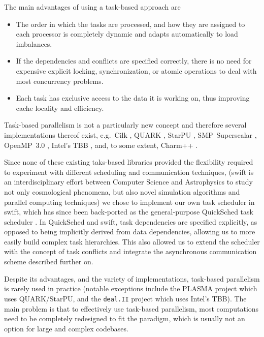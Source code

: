 \documentclass{sig-alternate-05-2015}
\newcommand{\swift}{{\sc swift}\xspace}
\newcommand{\qs}{{\sc QuickSched}\xspace}
\begin{document}
The main advantages of using a task-based approach are
%
\begin{itemize}
    \item The order in which the tasks are processed, and how they
        are assigned to each processor is completely
        dynamic and adapts automatically to load imbalances.
    \item If the dependencies and conflicts are specified correctly,
        there is no need for expensive explicit locking, synchronization,
        or atomic operations to deal with most concurrency problems.
    \item Each task has exclusive access to the data it is working on,
        thus improving cache locality and efficiency.
\end{itemize}
%
Task-based parallelism is not a particularly new concept and therefore
several implementations thereof exist, e.g.~Cilk \cite{ref:Blumofe1995},
QUARK \cite{ref:QUARK}, StarPU \cite{ref:Augonnet2011},
SMP~Superscalar \cite{ref:SMPSuperscalar}, OpenMP~3.0 \cite{ref:Duran2009},
Intel's TBB \cite{ref:Reinders2007}, and, to some extent,
Charm++ \cite{ref:Kale1993}.

Since none of these existing taks-based libraries provided the flexibility
required to experiment with different scheduling and communication
techniques, (\swift is an interdisciplinary effort between
Computer Science and Astrophysics to study not only cosmological
phenomena, but also novel simulation algorithms and parallel computing techniques)
we chose to implement our own task scheduler
in \swift, which has since been back-ported as the general-purpose
\qs task scheduler \cite{gonnet2013quicksched}.
In \qs and \swift, task dependencies are specified explicitly,
as opposed to being implicitly derived from data dependencies,
allowing us to more easily build complex task hierarchies.
This also allowed us to extend the scheduler with the concept of
task conflicts and integrate the asynchronous communication
scheme described further on.

Despite its advantages, and the variety of implementations,
task-based parallelism is rarely used in
practice (notable exceptions include the PLASMA project
\cite{ref:Agullo2009} which uses QUARK/StarPU, and the {\tt deal.II} project
\cite{ref:Bangerth2007} which uses Intel's TBB).
The main problem is that to effectively use task-based parallelism,
most computations need to be completely redesigned to fit the paradigm,
which is usually not an option for large and complex codebases.
\end{document}

